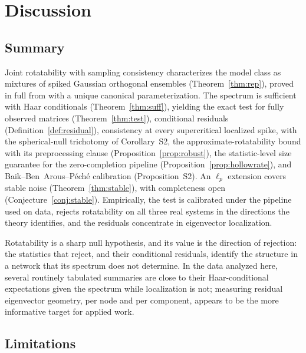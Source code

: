 \section{Discussion}
\label{sec:discussion}

\subsection{Summary}

Joint rotatability with sampling consistency characterizes the model
class as mixtures of spiked Gaussian orthogonal ensembles
(Theorem~\ref{thm:rep}), proved in full from
\citet[Theorem~5.1]{kallenberg1988some} with a unique canonical
parameterization. The spectrum is sufficient with Haar conditionals
(Theorem~\ref{thm:suff}), yielding the exact test for fully observed
matrices (Theorem~\ref{thm:test}), conditional residuals (Definition~\ref{def:residual}), consistency at every supercritical localized spike, with the
spherical-null trichotomy of Corollary~S2, the approximate-rotatability bound with its
preprocessing clause (Proposition~\ref{prop:robust}), the
statistic-level size guarantee for the zero-completion pipeline
(Proposition~\ref{prop:hollowrate}), and
Baik--Ben~Arous--P\'ech\'e calibration (Proposition~S2). An $\ell_p$ extension covers stable noise
(Theorem~\ref{thm:stable}), with completeness open
(Conjecture~\ref{conj:stable}). Empirically, the test is calibrated
under the pipeline used on data, rejects rotatability on all three real
systems in the directions the theory identifies, and the residuals
concentrate in eigenvector localization.

Rotatability is a sharp null hypothesis, and its value is the
direction of rejection: the statistics that reject, and their
conditional residuals, identify the structure in a network that its
spectrum does not determine. In the data analyzed here, several routinely tabulated summaries are
close to their Haar-conditional expectations given the spectrum while
localization is not; measuring residual eigenvector geometry, per node
and per component, appears to be the more informative target for
applied work.

\subsection{Limitations}

